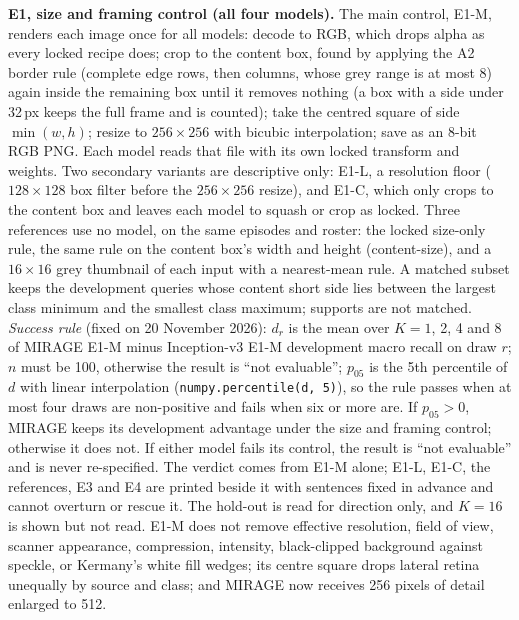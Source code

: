 \documentclass[conference]{IEEEtran}
\begin{document}
\textbf{E1, size and framing control (all four models).} The main control, E1-M, renders each image once for all models: decode to RGB, which drops alpha as every locked recipe does; crop to the content box, found by applying the A2 border rule (complete edge rows, then columns, whose grey range is at most 8) again inside the remaining box until it removes nothing (a box with a side under 32\,px keeps the full frame and is counted); take the centred square of side $\min(w,h)$; resize to $256\times256$ with bicubic interpolation; save as an 8-bit RGB PNG. Each model reads that file with its own locked transform and weights. Two secondary variants are descriptive only: E1-L, a resolution floor ($128\times128$ box filter before the $256\times256$ resize), and E1-C, which only crops to the content box and leaves each model to squash or crop as locked. Three references use no model, on the same episodes and roster: the locked size-only rule, the same rule on the content box's width and height (content-size), and a $16\times16$ grey thumbnail of each input with a nearest-mean rule. A matched subset keeps the development queries whose content short side lies between the largest class minimum and the smallest class maximum; supports are not matched. \emph{Success rule} (fixed on 20 November 2026): $d_r$ is the mean over $K=1$, 2, 4 and 8 of MIRAGE E1-M minus Inception-v3 E1-M development macro recall on draw $r$; $n$ must be 100, otherwise the result is ``not evaluable''; $p_{05}$ is the 5th percentile of $d$ with linear interpolation (\texttt{numpy.percentile(d, 5)}), so the rule passes when at most four draws are non-positive and fails when six or more are. If $p_{05}>0$, MIRAGE keeps its development advantage under the size and framing control; otherwise it does not. If either model fails its control, the result is ``not evaluable'' and is never re-specified. The verdict comes from E1-M alone; E1-L, E1-C, the references, E3 and E4 are printed beside it with sentences fixed in advance and cannot overturn or rescue it. The hold-out is read for direction only, and $K=16$ is shown but not read. E1-M does not remove effective resolution, field of view, scanner appearance, compression, intensity, black-clipped background against speckle, or Kermany's white fill wedges; its centre square drops lateral retina unequally by source and class; and MIRAGE now receives 256 pixels of detail enlarged to 512.
\end{document}
